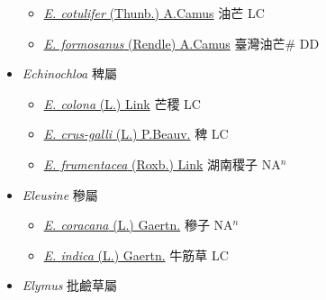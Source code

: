 \begin{itemize}
  \begin{itemize}
        \item[] \href{http://www.theplantlist.org/tpl1.1/search?q=Eccoilopus+cotulifer}{\textit{E. cotulifer} (Thunb.) A.Camus}   油芒 LC
        \item[] \href{http://www.theplantlist.org/tpl1.1/search?q=Eccoilopus+formosanus}{\textit{E. formosanus} (Rendle) A.Camus}   臺灣油芒\# DD
  \end{itemize}
 \item[] \textit{Echinochloa} 稗屬
                    
  \begin{itemize}
        \item[] \href{http://www.theplantlist.org/tpl1.1/search?q=Echinochloa+colona}{\textit{E. colona} (L.) Link}   芒稷 LC
        \item[] \href{http://www.theplantlist.org/tpl1.1/search?q=Echinochloa+crus-galli}{\textit{E. crus-galli} (L.) P.Beauv.}   稗 LC
        \item[] \href{http://www.theplantlist.org/tpl1.1/search?q=Echinochloa+frumentacea}{\textit{E. frumentacea} (Roxb.) Link}   湖南稷子 NA$^n$
  \end{itemize}
 \item[] \textit{Eleusine} 穇屬
                    
  \begin{itemize}
        \item[] \href{http://www.theplantlist.org/tpl1.1/search?q=Eleusine+coracana}{\textit{E. coracana} (L.) Gaertn.}   穇子 NA$^n$
        \item[] \href{http://www.theplantlist.org/tpl1.1/search?q=Eleusine+indica}{\textit{E. indica} (L.) Gaertn.}   牛筋草 LC
  \end{itemize}
 \item[] \textit{Elymus} 批鹼草屬
                    

\end{itemize}
